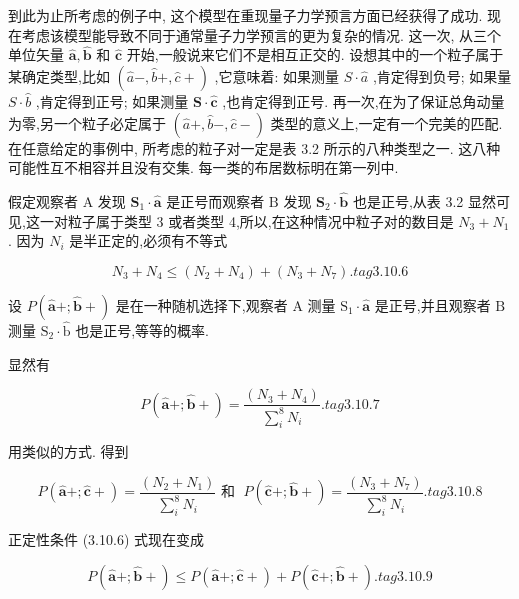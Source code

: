 到此为止所考虑的例子中, 这个模型在重现量子力学预言方面已经获得了成功. 现在考虑该模型能导致不同于通常量子力学预言的更为复杂的情况. 这一次, 从三个单位矢量 $\widehat{\mathbf{a}},\widehat{\mathbf{b}}$ 和 $\widehat{\mathbf{c}}$ 开始,一般说来它们不是相互正交的. 设想其中的一个粒子属于某确定类型,比如 $\left( {\widehat{a}-,\widehat{b} + ,\widehat{c} + }\right)$ ,它意味着: 如果测量 $S \cdot \widehat{a}$ ,肯定得到负号; 如果量 $S \cdot \widehat{b}$ ,肯定得到正号; 如果测量 $\mathbf{S} \cdot \widehat{\mathbf{c}}$ ,也肯定得到正号. 再一次,在为了保证总角动量为零,另一个粒子必定属于 $\left( {\widehat{a}+,\widehat{b}-,\widehat{c} - }\right)$ 类型的意义上,一定有一个完美的匹配. 在任意给定的事例中, 所考虑的粒子对一定是表 3.2 所示的八种类型之一. 这八种可能性互不相容并且没有交集. 每一类的布居数标明在第一列中.

假定观察者 $\mathrm{A}$ 发现 ${\mathbf{S}}_{1} \cdot \widehat{\mathbf{a}}$ 是正号而观察者 $\mathrm{B}$ 发现 ${\mathbf{S}}_{2} \cdot \widehat{\mathbf{b}}$ 也是正号,从表 3.2 显然可见,这一对粒子属于类型 3 或者类型 4,所以,在这种情况中粒子对的数目是 ${N}_{3} + {N}_{1}$ . 因为 ${N}_{i}$ 是半正定的,必须有不等式

$$
{N}_{3} + {N}_{4} \leq \left( {{N}_{2} + {N}_{4}}\right) + \left( {{N}_{3} + {N}_{7}}\right) . tag{3.10.6}
$$

设 $P\left( {\widehat{\mathbf{a}}+;\widehat{\mathbf{b}} + }\right)$ 是在一种随机选择下,观察者 $\mathrm{A}$ 测量 ${\mathrm{S}}_{1} \cdot \widehat{\mathbf{a}}$ 是正号,并且观察者 $\mathrm{B}$ 测量 ${\mathrm{S}}_{2} \cdot \widehat{\mathrm{b}}$ 也是正号,等等的概率.



显然有

$$
P\left( {\widehat{\mathbf{a}}+;\widehat{\mathbf{b}} + }\right) = \frac{\left( {N}_{3} + {N}_{4}\right) }{\mathop{\sum }\limits_{i}^{8}{N}_{i}}. tag{3.10.7}
$$

用类似的方式. 得到

$$
P\left( {\widehat{\mathbf{a}}+;\widehat{\mathbf{c}} + }\right) = \frac{\left( {N}_{2} + {N}_{1}\right) }{\mathop{\sum }\limits_{i}^{8}{N}_{i}}\text{ 和 }\;P\left( {\widehat{\mathbf{c}}+;\widehat{\mathbf{b}} + }\right) = \frac{\left( {N}_{3} + {N}_{7}\right) }{\mathop{\sum }\limits_{i}^{8}{N}_{i}}. tag{3.10.8}
$$

正定性条件 (3.10.6) 式现在变成

$$
P\left( {\widehat{\mathbf{a}}+;\widehat{\mathbf{b}} + }\right) \leq P\left( {\widehat{\mathbf{a}}+;\widehat{\mathbf{c}} + }\right) + P\left( {\widehat{\mathbf{c}}+;\widehat{\mathbf{b}} + }\right) . tag{3.10.9}
$$

